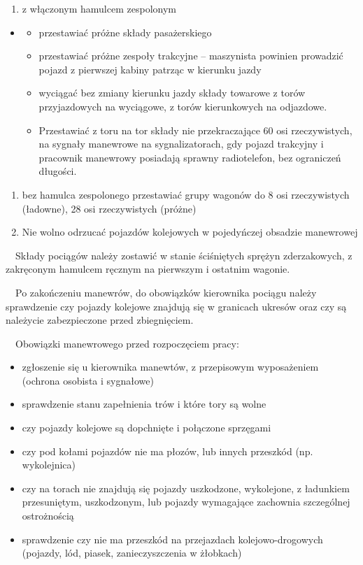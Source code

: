 \begin{enumerate}
\item z włączonym hamulcem zespolonym
\end{enumerate}
\begin{itemize}
\item \begin{itemize}
\item przestawiać próżne składy pasażerskiego
\item przestawiać próżne zespoły trakcyjne – maszynista powinien prowadzić pojazd z pierwszej kabiny patrząc w kierunku
jazdy
\item wyciągać bez zmiany kierunku jazdy składy towarowe z torów przyjazdowych na wyciągowe, z torów kierunkowych na
odjazdowe.
\item Przestawiać z toru na tor składy nie przekraczające 60 osi rzeczywistych, na sygnały manewrowe na sygnalizatorach,
gdy pojazd trakcyjny i pracownik manewrowy posiadają sprawny radiotelefon, bez ograniczeń długości.
\end{itemize}
\end{itemize}
\begin{enumerate}
\item bez hamulca zespolonego przestawiać grupy wagonów do 8 osi rzeczywistych (ładowne), 28  osi rzeczywistych (próżne)
\item Nie wolno odrzucać pojazdów kolejowych w pojedyńczej obsadzie manewrowej
\end{enumerate}
\ \ Składy pociągów należy zostawić w stanie ściśniętych sprężyn zderzakowych, z zakręconym hamulcem ręcznym na
pierwszym i ostatnim wagonie.

\ \ Po zakończeniu manewrów, do obowiązków kierownika pociągu należy sprawdzenie czy pojazdy kolejowe znajdują się w
granicach ukresów oraz czy są należycie zabezpieczone przed zbiegnięciem.

\ \ Obowiązki manewrowego przed rozpoczęciem pracy:

\begin{itemize}
\item zgłoszenie się u kierownika manewtów, z przepisowym wyposażeniem (ochrona osobista i sygnałowe)
\item sprawdzenie stanu zapełnienia trów i które tory są wolne
\item czy pojazdy kolejowe są dopchnięte i połączone sprzęgami
\item czy pod kołami pojazdów nie ma płozów, lub innych przeszkód (np. wykolejnica)
\item czy na torach nie znajdują się pojazdy uszkodzone, wykolejone, z ładunkiem przesuniętym, uszkodzonym, lub pojazdy
wymagające zachownia szczególnej ostrożnością
\item sprawdzenie czy nie ma przeszkód na przejazdach kolejowo-drogowych (pojazdy, lód, piasek, zanieczyszczenia w
żłobkach)
\end{itemize}

